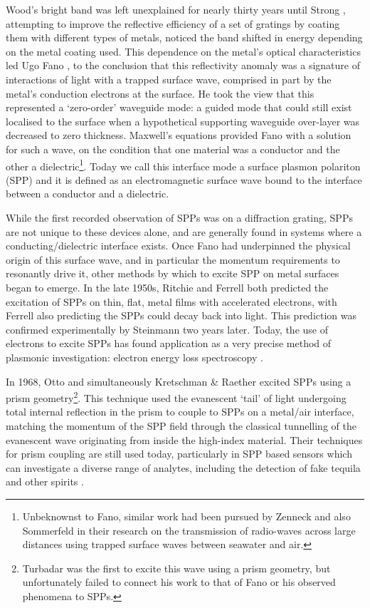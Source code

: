 Wood's bright band was left unexplained for nearly thirty years until Strong \cite{Strong1936}, attempting to improve the reflective efficiency of a set of gratings by coating them with different types of metals, noticed the band shifted in energy depending on the metal coating used. This dependence on the metal's optical characteristics led Ugo Fano \cite{Fano1936,Fano1941,Fano1937}, to the conclusion that this reflectivity anomaly was a signature of interactions of light with a trapped surface wave, comprised in part by the metal's conduction electrons at the surface. He took the view that this represented a `zero-order' waveguide mode: a guided mode that could still exist localised to the surface when a hypothetical supporting waveguide over-layer was decreased to zero thickness. Maxwell's equations provided Fano with a solution for such a wave, on the condition that one material was a conductor and the other a dielectric\footnote{Unbeknownst to Fano, similar work had been pursued by Zenneck \cite{Zenneck1907a} and also Sommerfeld \cite{Sommerfeld1909} in their research on the transmission of radio-waves across large distances using trapped surface waves between seawater and air.}. Today we call this interface mode a surface plasmon polariton (SPP) and it is defined as an electromagnetic surface wave bound to the interface between a conductor and a dielectric. 

While the first recorded observation of SPPs was on a diffraction grating, SPPs are not unique to these devices alone, and are generally found in systems where a conducting/dielectric interface exists. Once Fano had underpinned the physical origin of this surface wave, and in particular the momentum requirements to resonantly drive it, other methods by which to excite SPP on metal surfaces began to emerge. In the late 1950s, Ritchie \cite{Ritchie1957} and Ferrell \cite{Ferrell1958} both predicted the excitation of SPPs on thin, flat, metal films with accelerated electrons, with Ferrell also predicting the SPPs could decay back into light. This prediction was confirmed experimentally by Steinmann \cite{Steinmann1960} two years later. Today, the use of electrons to excite SPPs has found application as a very precise method of plasmonic investigation: electron energy loss spectroscopy \cite{Abajo2008}. 

In 1968, Otto \cite{Otto1968} and simultaneously Kretschman \& Raether \cite{Kretschmann1968} excited SPPs using a prism geometry\footnote{Turbadar \cite{Turbadar1959} was the first to excite this wave using a prism geometry, but unfortunately failed to connect his work to that of Fano or his observed phenomena to SPPs.}. This technique used the evanescent `tail' of light undergoing total internal reflection in the prism to couple to SPPs on a metal/air interface, matching the momentum of the SPP field through the classical tunnelling of the evanescent wave originating from inside the high-index material. Their techniques for prism coupling are still used today, particularly in SPP based sensors which can investigate a diverse range of analytes, including the detection of fake tequila \cite{Monzo2011} and other spirits \cite{Mitsushio2012}. 

